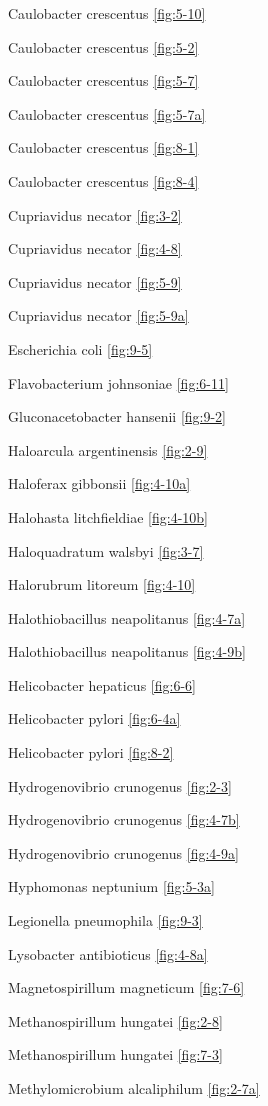 \documentclass[]{tufte-book}
\begin{document}
Caulobacter crescentus \ref{fig:5-10}

Caulobacter crescentus \ref{fig:5-2}

Caulobacter crescentus \ref{fig:5-7}

Caulobacter crescentus \ref{fig:5-7a}

Caulobacter crescentus \ref{fig:8-1}

Caulobacter crescentus \ref{fig:8-4}

Cupriavidus necator \ref{fig:3-2}

Cupriavidus necator \ref{fig:4-8}

Cupriavidus necator \ref{fig:5-9}

Cupriavidus necator \ref{fig:5-9a}

Escherichia coli \ref{fig:9-5}

Flavobacterium johnsoniae \ref{fig:6-11}

Gluconacetobacter hansenii \ref{fig:9-2}

Haloarcula argentinensis \ref{fig:2-9}

Haloferax gibbonsii \ref{fig:4-10a}

Halohasta litchfieldiae \ref{fig:4-10b}

Haloquadratum walsbyi \ref{fig:3-7}

Halorubrum litoreum \ref{fig:4-10}

Halothiobacillus neapolitanus \ref{fig:4-7a}

Halothiobacillus neapolitanus \ref{fig:4-9b}

Helicobacter hepaticus \ref{fig:6-6}

Helicobacter pylori \ref{fig:6-4a}

Helicobacter pylori \ref{fig:8-2}

Hydrogenovibrio crunogenus \ref{fig:2-3}

Hydrogenovibrio crunogenus \ref{fig:4-7b}

Hydrogenovibrio crunogenus \ref{fig:4-9a}

Hyphomonas neptunium \ref{fig:5-3a}

Legionella pneumophila \ref{fig:9-3}

Lysobacter antibioticus \ref{fig:4-8a}

Magnetospirillum magneticum \ref{fig:7-6}

Methanospirillum hungatei \ref{fig:2-8}

Methanospirillum hungatei \ref{fig:7-3}

Methylomicrobium alcaliphilum \ref{fig:2-7a}
\end{document}
